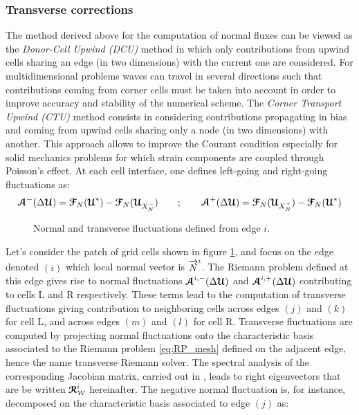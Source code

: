 \subsubsection*{Transverse corrections}

The method derived above for the computation of normal fluxes can be viewed as the \textit{Donor-Cell Upwind (DCU)} method \cite{Leveque} in which only contributions from upwind cells sharing an edge (in two dimensions) with the current one are considered. For multidimensional problems waves can travel in several directions such that contributions coming from corner cells must be taken into account in order to improve accuracy and stability of the numerical scheme. The \textit{Corner Transport Upwind (CTU)} method \cite{Colella_CTU} consists in considering contributions propagating in bias and coming from upwind cells sharing only a node (in two dimensions) with another. This approach allows to improve the Courant condition especially for solid mechanics problems for which strain components are coupled through Poisson's effect. At each cell interface, one defines left-going and right-going fluctuations as:
\begin{equation}
  {\boldsymbol{\mathcal{A}}}^-(\Delta {\boldsymbol{\mathcal{U}}}) = {\boldsymbol{\mathcal{F}}}_N({\boldsymbol{\mathcal{U}}}^*) - {\boldsymbol{\mathcal{F}}}_N({\boldsymbol{\mathcal{U}}}_{X_N^-}) \qquad ;  \qquad {\boldsymbol{\mathcal{A}}}^+(\Delta {\boldsymbol{\mathcal{U}}}) = {\boldsymbol{\mathcal{F}}}_N({\boldsymbol{\mathcal{U}}}_{X_N^+})-{\boldsymbol{\mathcal{F}}}_N({\boldsymbol{\mathcal{U}}}^*) 
\end{equation}
\begin{figure}[h!]
  \centering
  
  \caption{Normal and transverse fluctuations defined from edge $i$.}
  \label{fig:CTU}
\end{figure}
Let's consider the patch of grid cells shown in figure \ref{fig:CTU}, and focus on the edge denoted $(i)$ which local normal vector is ${\overrightarrow{N}}^i$. The Riemann problem defined at this edge gives rise to normal fluctuations ${\boldsymbol{\mathcal{A}}}^{i,-}(\Delta {\boldsymbol{\mathcal{U}}})$ and ${\boldsymbol{\mathcal{A}}}^{i,+}(\Delta {\boldsymbol{\mathcal{U}}})$ contributing to cells L and R respectively. These terms lead to the computation of transverse fluctuations giving contribution to neighboring cells across edges $(j)$ and $(k)$ for cell L, and across edges $(m)$ and $(l)$ for cell R. Transverse fluctuations are computed by projecting normal fluctuations onto the characteristic basis associated to the Riemann problem \eqref{eq:RP_mesh} defined on the adjacent edge, hence the name transverse Riemann solver. The spectral analysis of the corresponding Jacobian matrix, carried out in \cite{Kluth}, leads to right eigenvectors that are be written ${\boldsymbol{\mathcal{R}}}_{\mathcal{W}}^i$ hereinafter. The negative normal fluctuation is, for instance, decomposed on the characteristic basis associated to edge $(j)$ as:
